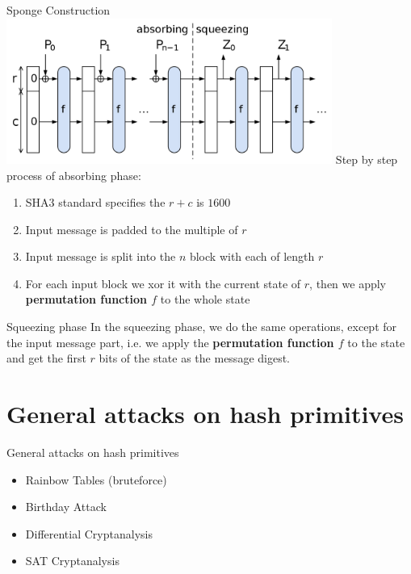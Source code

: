 \documentclass{beamer}
\begin{document}
\begin{frame}{Sponge Construction}
    \includegraphics[width=0.8\textwidth]{SpongeConstruction.svg.png}
    Step by step process of absorbing phase:
    \begin{enumerate}
        \item SHA3 standard specifies the $r+c$ is $1600$
        \item Input message is padded to the multiple of $r$
        \item Input message is split into the $n$ block with each of length $r$
        \item For each input block we xor it with the current state of $r$,
        then we apply \textbf{permutation function $f$} to the whole state
    \end{enumerate}
\end{frame}

\begin{frame}{Squeezing phase}
    In the squeezing phase, we do the same operations, except for the input
    message part, i.e. we apply the \textbf{permutation function $f$} to the
    state and get the first $r$ bits of the state as the message digest.
\end{frame}

\section{General attacks on hash primitives}

\begin{frame}{General attacks on hash primitives}
    \begin{itemize}
        \item Rainbow Tables (bruteforce)
        \item Birthday Attack
        \item Differential Cryptanalysis
        \item SAT Cryptanalysis
    \end{itemize}
\end{frame}
\end{document}
